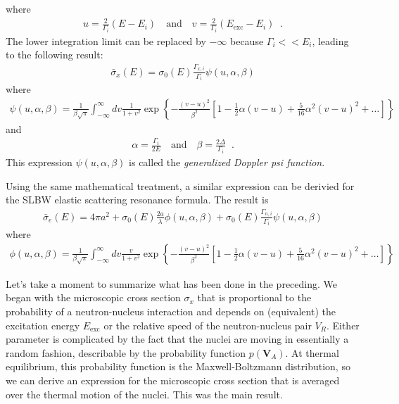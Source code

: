\documentclass[11pt]{article}
\renewcommand\vec{\mathbf}
\begin{document}
where
\begin{align}
  u = \frac{2}{\Gamma_i}\left(E - E_i\right)
  \quad \text{and} \quad
  v = \frac{2}{\Gamma_i}\left(E_\text{exc} - E_i\right) \;\;.
\end{align}
The lower integration limit can be replaced by \(-\infty\) because \(\Gamma_i << E_i\), leading to the following result:
\begin{align}
  \bar{\sigma}_x(E) = \sigma_0(E) \frac{\Gamma_{x,i}}{\Gamma_i} \psi(u,\alpha,\beta)
\end{align}
where
\begin{align}
  \psi(u,\alpha,\beta) = \frac{1}{\beta\sqrt{\pi}}
                         \int_{-\infty}^\infty dv \frac{1}{1+v^2} \exp\left\{ -\frac{(v-u)^2}{\beta^2}
                         \left[ 1 - \frac{1}{2}\alpha(v-u) + \frac{5}{16}\alpha^2(v-u)^2 + \hdots \right] \right\}
\end{align}
and
\begin{align}
  \alpha = \frac{\Gamma_i}{2E}
  \quad \text{and} \quad
  \beta = \frac{2\Delta}{\Gamma_i} \;\;.
\end{align}
This expression \(\psi(u,\alpha,\beta)\) is called the \emph{generalized Doppler psi function}.

Using the same mathematical treatment, a similar expression can be derivied for the SLBW elastic scattering resonance formula.  The result is
\begin{align}
  \label{eq::dopplerSLBWe}
  \bar{\sigma}_e(E) = 4\pi a^2 + \sigma_0(E)\frac{2a}{\lambda}\phi(u,\alpha,\beta) + \sigma_0(E)\frac{\Gamma_{n,i}}{\Gamma_i}\psi(u,\alpha,\beta)
\end{align}
where
\begin{align}
  \phi(u,\alpha,\beta) = \frac{1}{\beta\sqrt{\pi}}
                         \int_{-\infty}^\infty dv \frac{v}{1+v^2} \exp\left\{ -\frac{(v-u)^2}{\beta^2}
                         \left[ 1 - \frac{1}{2}\alpha(v-u) + \frac{5}{16}\alpha^2(v-u)^2 + \hdots \right] \right\}
\end{align}

Let's take a moment to summarize what has been done in the preceding. We began with the microscopic cross section \(\sigma_x\) that is proportional to the probability of a neutron-nucleus interaction and depends on (equivalent) the excitation energy \(E_\text{exc}\) or the relative speed of the neutron-nucleus pair \(V_R\).  Either parameter is complicated by the fact that the nuclei are moving in essentially a random fashion, describable by the probability function \(p(\vec{V}_A)\).  At thermal equilibrium, this probability function is the Maxwell-Boltzmann distribution, so we can derive an expression for the microscopic cross section that is averaged over the thermal motion of the nuclei.  This was the main result.
\end{document}
